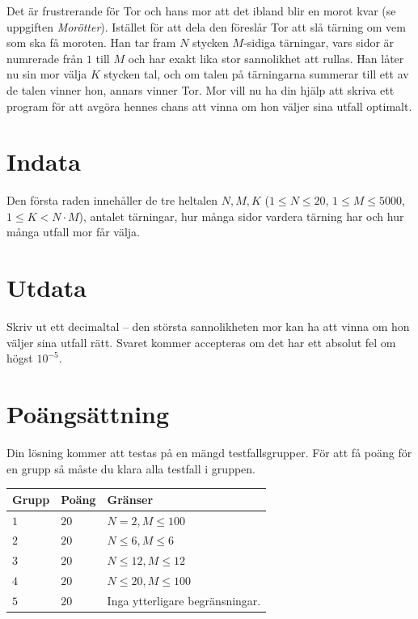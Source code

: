 Det är frustrerande för Tor och hans mor att det ibland blir en morot kvar (se uppgiften \emph{Morötter}).
Istället för att dela den föreslår Tor att slå tärning om vem som ska få moroten.
Han tar fram $N$ stycken $M$-sidiga tärningar, vars sidor är numrerade från $1$ till $M$ och har exakt lika stor sannolikhet att rullas.
Han låter nu sin mor välja $K$ stycken tal, och om talen på tärningarna summerar till ett av de talen vinner hon, annars vinner Tor.
Mor vill nu ha din hjälp att skriva ett program för att avgöra hennes chans att vinna om hon väljer sina utfall optimalt.

\section*{Indata}
Den första raden innehåller de tre heltalen $N, M, K$ ($1 \le N \le 20$, $1 \le M \le 5000$, $1 \le K < N \cdot M$), antalet tärningar, hur många sidor vardera tärning har och hur många utfall mor får välja.

\section*{Utdata}
Skriv ut ett decimaltal -- den största sannolikheten mor kan ha att vinna om hon väljer sina utfall rätt. 
Svaret kommer accepteras om det har ett absolut fel om högst $10^{-5}$.

\section*{Poängsättning}
Din lösning kommer att testas på en mängd testfallsgrupper.
För att få poäng för en grupp så måste du klara alla testfall i gruppen.

\noindent
\begin{tabular}{| l | l | p{12cm} |}
  \hline
  \textbf{Grupp} & \textbf{Poäng} & \textbf{Gränser} \\ \hline
  $1$    & $20$        & $N=2,      M \le 100 $   \\ \hline 
  $2$    & $20$        & $N \le 6,  M \le 6 $  \\ \hline
  $3$    & $20$        & $N \le 12, M \le 12 $  \\ \hline 
  $4$    & $20$        & $N \le 20, M \le 100 $  \\ \hline
  $5$    & $20$        & Inga ytterligare begränsningar.  \\ \hline
\end{tabular}
